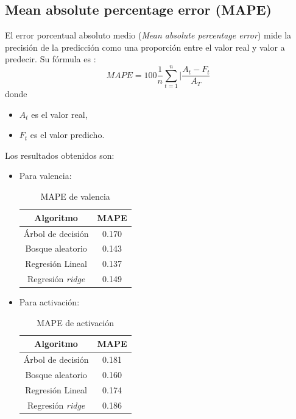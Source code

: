 \documentclass[12pt,a4paper,Spanish]{article}
\begin{document}
\subsection{Mean absolute percentage error (MAPE)}
El error porcentual absoluto medio (\textit{Mean absolute percentage error}) mide la precisión de la predicción como una proporción entre el valor real y valor a predecir. Su fórmula es \cite{enwiki:1225070385}:
\begin{equation}
	MAPE = 100 \frac{1}{n} \sum_{t=1}^{n} |\frac{A_t - F_t}{A_T} 
\end{equation}
donde
\begin{itemize}
	\item $A_t$ es el valor real,
	\item $F_t$ es el valor predicho.
\end{itemize}
Los resultados obtenidos son:
\begin{itemize}
	\item Para valencia:
	\begin{table}[H]
		\centering
		\caption{MAPE de valencia}
		\begin{tabular}{|c|c|}
			\hline
			\textbf{Algoritmo} & \textbf{MAPE} \\
			\hline
			Árbol de decisión & 0.170 \\
			Bosque aleatorio & 0.143 \\
			Regresión Lineal & 0.137 \\
			Regresión \textit{ridge} & 0.149 \\
			\hline
		\end{tabular}
	\end{table}
	\item Para activación:
	\begin{table}[H]
		\centering
		\caption{MAPE de activación}
		\begin{tabular}{|c|c|}
			\hline
			\textbf{Algoritmo} & \textbf{MAPE} \\
			\hline
			Árbol de decisión & 0.181 \\
			Bosque aleatorio & 0.160 \\
			Regresión Lineal & 0.174 \\
			Regresión \textit{ridge} & 0.186 \\
			\hline
		\end{tabular}
	\end{table}
\end{itemize}
\end{document}
